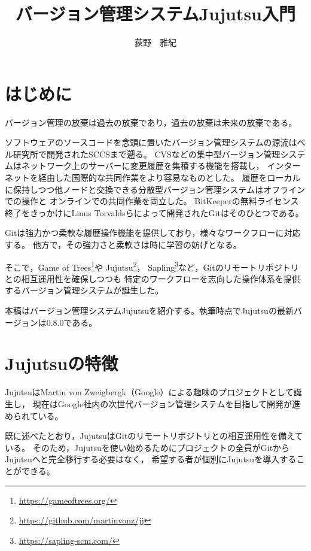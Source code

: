 \documentclass[b5j,twocolumn]{ltjsarticle}
\title{バージョン管理システムJujutsu入門}
\author{荻野　雅紀}
\date{}
\begin{document}
\pagestyle{empty}
\maketitle

\section{はじめに}

バージョン管理の放棄は過去の放棄であり，過去の放棄は未来の放棄である。

ソフトウェアのソースコードを念頭に置いたバージョン管理システムの源流はベル研究所で開発されたSCCSまで遡る。
CVSなどの集中型バージョン管理システムはネットワーク上のサーバーに変更履歴を集積する機能を搭載し，
インターネットを経由した国際的な共同作業をより容易なものとした。
履歴をローカルに保持しつつ他ノードと交換できる分散型バージョン管理システムはオフラインでの操作と
オンラインでの共同作業を両立した。
BitKeeperの無料ライセンス終了をきっかけにLinus Torvaldsらによって開発されたGitはそのひとつである。

Gitは強力かつ柔軟な履歴操作機能を提供しており，様々なワークフローに対応する。
他方で，その強力さと柔軟さは時に学習の妨げとなる。

そこで，Game of Trees\footnote{\url{https://gameoftrees.org/}}や
Jujutsu\footnote{\url{https://github.com/martinvonz/jj}}，
Sapling\footnote{\url{https://sapling-scm.com/}}など，Gitのリモートリポジトリとの相互運用性を確保しつつも
特定のワークフローを志向した操作体系を提供するバージョン管理システムが誕生した。

本稿はバージョン管理システムJujutsuを紹介する。執筆時点でJujutsuの最新バージョンは0.8.0である。

\section{Jujutsuの特徴}

JujutsuはMartin von Zweigbergk（Google）による趣味のプロジェクトとして誕生し，
現在はGoogle社内の次世代バージョン管理システムを目指して開発が進められている。

既に述べたとおり，JujutsuはGitのリモートリポジトリとの相互運用性を備えている。
そのため，Jujutsuを使い始めるためにプロジェクトの全員がGitからJujutsuへと完全移行する必要はなく，
希望する者が個別にJujutsuを導入することができる。
\end{document}
